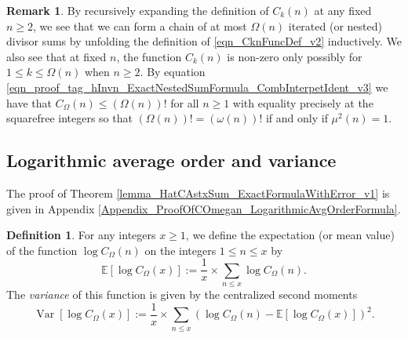 \documentclass[11pt,reqno,a4letter]{article}
\newcommand{\hlocalref}[1]{\hyperref[#1]{\ref{#1}}}
\numberwithin{equation}{section}
\numberwithin{figure}{section}
\numberwithin{table}{section}
\theoremstyle{plain}
\numberwithin{theorem}{section}
\theoremstyle{definition}
\newtheorem{remark}[theorem]{Remark}
\newtheorem{definition}[theorem]{Definition}
\theoremstyle{remark}
\begin{document}
\begin{remark}
By recursively expanding the definition of $C_k(n)$ 
at any fixed $n \geq 2$, we see that 
we can form a chain of at most $\Omega(n)$ iterated (or nested) divisor sums by 
unfolding the definition of \eqref{eqn_CknFuncDef_v2} inductively. 
We also see that at fixed $n$, the function 
$C_k(n)$ is non-zero only possibly for 
$1 \leq k \leq \Omega(n)$ when $n \geq 2$. 
By equation \eqref{eqn_proof_tag_hInvn_ExactNestedSumFormula_CombInterpetIdent_v3} we have 
that $C_{\Omega}(n) \leq (\Omega(n))!$ for all $n \geq 1$ with 
equality precisely at the squarefree integers so that 
$(\Omega(n))! = (\omega(n))!$ if and only if $\mu^2(n) = 1$. 
\end{remark}

\subsection{Logarithmic average order and variance}
\label{subSection_AvgOrdersOfTheUnsignedSequences} 

The proof of Theorem \hlocalref{lemma_HatCAstxSum_ExactFormulaWithError_v1} is 
given in Appendix \hlocalref{Appendix_ProofOfCOmegan_LogarithmicAvgOrderFormula}. 

\begin{definition}
\label{def_AvgOrder_FirstAndSecondMomentsOfFuncs_v1}
For any integers $x \geq 1$, we define the expectation (or mean value) of the 
function $\log C_{\Omega}(n)$ on the integers $1 \leq n \leq x$ by 
\[
\mathbb{E}\left[\log C_{\Omega}(x)\right] := \frac{1}{x} \times \sum_{n \leq x} 
     \log C_{\Omega}(n). 
\]
The \emph{variance} of this function is given by the 
centralized second moments 
\[
\operatorname{Var}\left[\log C_{\Omega}(x)\right] := 
	\frac{1}{x} \times \sum_{n \leq x} \left(\log C_{\Omega}(n) - 
	\mathbb{E}\left[\log C_{\Omega}(x)\right]\right)^2. 
\]
\end{definition}
\end{document}
